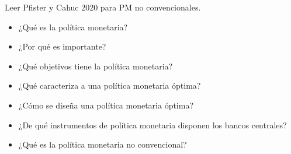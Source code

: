 \documentclass{nuevotema}
\begin{document}
\ideaclave

Leer Pfister y Cahuc 2020 para PM no convencionales.

\begin{itemize}
	\item ¿Qué es la política monetaria?
	\item ¿Por qué es importante?
	\item ¿Qué objetivos tiene la política monetaria?
	\item ¿Qué caracteriza a una política monetaria óptima?
	\item ¿Cómo se diseña una política monetaria óptima?
	\item ¿De qué instrumentos de política monetaria disponen los bancos centrales?
	\item ¿Qué es la política monetaria no convencional?
\end{itemize}

\esquemacorto
\end{document}
